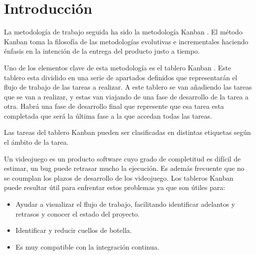 
\section{Introducción}
La metodología de trabajo seguida ha sido la metodología Kanban \cite{wiki:Kanban}. El método Kanban toma la filosofía de las metodologías evolutivas e incrementales haciendo énfasis en la intención de la entrega del producto justo a tiempo.

Uno de los elementos clave de esta metodología es el tablero Kanban \cite{TableroKanban}. Este tablero esta dividido en una serie de apartados definidos que representarán el flujo de trabajo de las tareas a realizar. A este tablero se van añadiendo las tareas que se van a realizar, y estas van viajando de una fase de desarrollo de la tarea a otra. Habrá una fase de desarrollo final que represente que esa tarea esta completada que será la última fase a la que accedan todas las tareas.

Las tareas del tablero Kanban pueden ser clasificadas en distintas etiquetas según el ámbito de la tarea.

Un videojuego es un producto software cuyo grado de completitud es difícil de estimar, un bug puede retrasar mucho la ejecución. Es además frecuente que no se coumplan los plazos de desarrollo de los videojuego. Los tableros Kanban puede resultar útil para enfrentar estos problemas ya que son útiles para:
\begin{itemize}
\item
Ayudar a visualizar el flujo de trabajo, facilitando identificar adelantos y retrasos y conocer el estado del proyecto.
\item
Identificar y reducir cuellos de botella.
\item
Es muy compatible con la integración continua.
\end{itemize}

